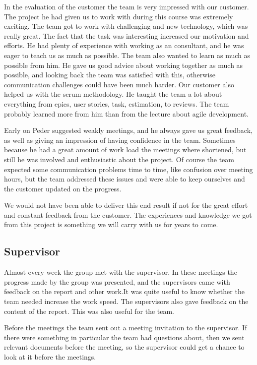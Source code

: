 In the evaluation of the customer the team is very impressed with our customer. The project he had given us to work with during this course was extremely exciting. The team got to work with challenging and new technology, which was really great. The fact that the task was interesting increased our motivation and efforts. He had plenty of experience with working as an consultant, and he was eager to teach us as much as possible. The team also wanted to learn as much as possible from him. He gave us good advice about working together as much as possible, and looking back the team was satisfied with this, otherwise communication challenges could have been much harder. Our customer also helped us with the scrum methodology. He taught the team a lot about everything from epics, user stories, task, estimation, to reviews. The team probably learned more from him than from the lecture about agile development. 

Early on Peder suggested weakly meetings, and he always gave us great feedback, as well as giving an impression of having confidence in the team. Sometimes because he had a great amount of work load the meetings where shortened, but still he was involved and enthusiastic about the project. Of course the team expected some communication problems time to time, like confusion over meeting hours, but the team addressed these issues and were able to keep ourselves and the customer updated on the progress.

We would not have been able to deliver this end result if not for the great effort and constant feedback from the customer. The experiences and knowledge we got from this project is something we will carry with us for years to come.

\subsection{Supervisor}
Almost every week the group met with the supervisor. In these meetings the progress made by
the group was presented, and the supervisors came with feedback on the report and other
work.It was quite useful to know whether the team needed increase the work speed. 
The supervisors also gave feedback on the content of the report. This was also useful for the team.

Before the meetings the team sent out a meeting invitation to the supervisor.
If there were something in particular the team had questions about, then we sent relevant documents before the meeting, so the supervisor could get a chance to look at it before the meetings.

